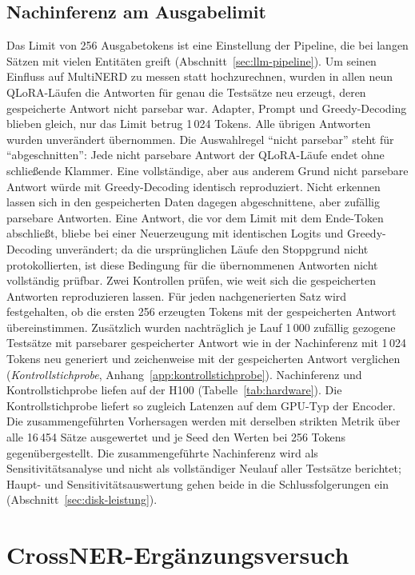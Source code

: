 \subsection{Nachinferenz am Ausgabelimit}
\label{sec:nachinferenz}

Das Limit von 256 Ausgabetokens ist eine Einstellung der Pipeline, die bei
langen Sätzen mit vielen Entitäten greift
(Abschnitt~\ref{sec:llm-pipeline}).
Um seinen Einfluss auf MultiNERD zu messen statt hochzurechnen, wurden in
allen neun QLoRA-Läufen die Antworten für genau die Testsätze neu erzeugt,
deren gespeicherte Antwort nicht parsebar war.
Adapter, Prompt und Greedy-Decoding blieben gleich, nur das Limit betrug
1\,024 Tokens.
Alle übrigen Antworten wurden unverändert übernommen.
Die Auswahlregel \enquote{nicht parsebar} steht für
\enquote{abgeschnitten}: Jede nicht parsebare Antwort der QLoRA-Läufe
endet ohne schließende Klammer.
Eine vollständige, aber aus anderem Grund nicht parsebare Antwort würde
mit Greedy-Decoding identisch reproduziert.
Nicht erkennen lassen sich in den gespeicherten Daten dagegen
abgeschnittene, aber zufällig parsebare Antworten.
Eine Antwort, die vor dem Limit mit dem Ende-Token abschließt, bliebe
bei einer Neuerzeugung mit identischen Logits und Greedy-Decoding
unverändert; da die
ursprünglichen Läufe den Stoppgrund nicht protokollierten, ist diese
Bedingung für die übernommenen Antworten nicht vollständig prüfbar.
Zwei Kontrollen prüfen, wie weit sich die gespeicherten Antworten
reproduzieren lassen.
Für jeden nachgenerierten Satz wird festgehalten, ob die ersten
256 erzeugten Tokens mit der gespeicherten Antwort übereinstimmen.
Zusätzlich wurden nachträglich je Lauf 1\,000 zufällig gezogene
Testsätze mit parsebarer gespeicherter Antwort wie in der Nachinferenz
mit 1\,024 Tokens neu generiert und zeichenweise mit der gespeicherten
Antwort verglichen
(\emph{Kontrollstichprobe}, Anhang~\ref{app:kontrollstichprobe}).
Nachinferenz und Kontrollstichprobe liefen auf der H100
(Tabelle~\ref{tab:hardware}). Die Kontrollstichprobe liefert so
zugleich Latenzen auf dem GPU-Typ der Encoder.
Die zusammengeführten Vorhersagen werden mit derselben strikten Metrik über
alle 16\,454 Sätze ausgewertet und je Seed den Werten bei 256 Tokens
gegenübergestellt.
Die zusammengeführte Nachinferenz wird als Sensitivitätsanalyse und nicht
als vollständiger Neulauf aller Testsätze berichtet; Haupt- und
Sensitivitätsauswertung gehen beide in die Schlussfolgerungen ein
(Abschnitt~\ref{sec:disk-leistung}).

\section{CrossNER-Ergänzungsversuch}
\label{sec:crossner}

